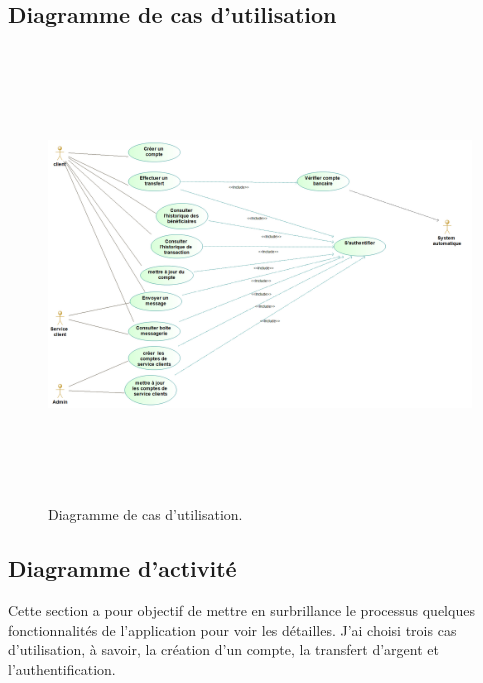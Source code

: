 \subsection{Diagramme de cas d’utilisation}
\begin{figure}[h!]
	\includegraphics[width=18cm, height=12cm]{./Template LaTeX/Images/use_case.png}
	\caption{Diagramme de cas d’utilisation.}
	\label{fig1:use_case}
	
	
\end{figure}
\newpage
\subsection{Diagramme d’activité}
Cette section a pour objectif de mettre en surbrillance le processus quelques fonctionnalités de
l’application pour voir les détailles. J’ai choisi trois cas d’utilisation, à savoir, la création d’un compte,
la transfert d'argent et l'authentification.
\newpage
